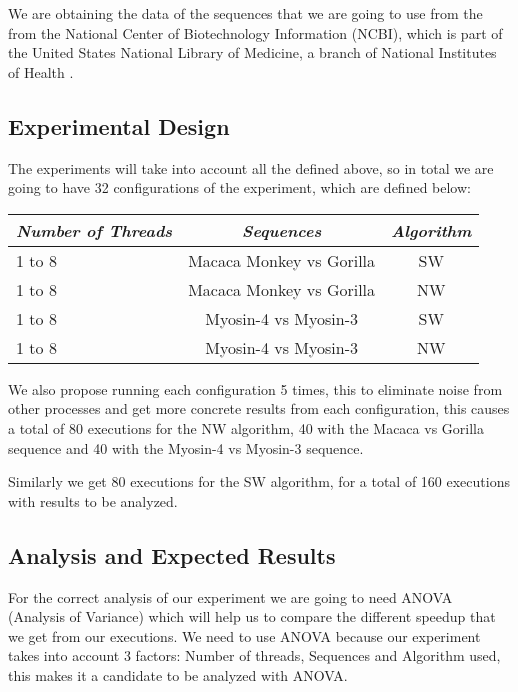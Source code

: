 \documentclass[journal]{IEEEtran}
\begin{document}
We are obtaining the data of the sequences that we are going to use from the from the National Center of Biotechnology Information (NCBI), which is part of the United States National Library of Medicine, a branch of National Institutes of Health \cite{NCBI}. 

\subsection{Experimental Design}

The experiments will take into account all the defined above, so in total we are going to have 32 configurations of the experiment, which are defined below:


\begin{center}
\begin{tabular}{|p{1.5cm}|c|c|}
\toprule
    \rowcolor{red!80} {\color{white} \emph{Number of Threads}} & {\color{white} \emph{Sequences}} & {\color{white} \emph{Algorithm}}\\\midrule
    
     1 to 8 & Macaca Monkey vs Gorilla & SW \\ \hline
     1 to 8 & Macaca Monkey vs Gorilla & NW \\ \hline
     1 to 8 & Myosin-4 vs Myosin-3 & SW \\ \hline
     1 to 8 & Myosin-4 vs Myosin-3 & NW \\ \hline

\bottomrule
\hline
\end{tabular}
\end{center}

We also propose running each configuration 5 times, this to eliminate noise from other processes and get more concrete results from each configuration, this causes a total of 80 executions for the NW algorithm, 40 with the Macaca vs Gorilla sequence and 40 with the Myosin-4 vs Myosin-3 sequence.

Similarly we get 80 executions for the SW algorithm, for a total of 160 executions with results to be analyzed.

\subsection{Analysis and Expected Results}

For the correct analysis of our experiment we are going to need ANOVA (Analysis of Variance) which will help us to compare the different speedup that we get from our executions. We need to use ANOVA because our experiment takes into account 3 factors: Number of threads, Sequences and Algorithm used, this makes it a candidate to be analyzed with ANOVA.
\end{document}
